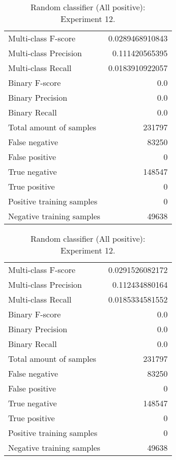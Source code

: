 \begin{table}[H]
\begin{minipage}{0.5\textwidth}
\caption{Random classifier (All positive): \\Experiment 11.}
\centering
\begin{tabular}{l r}
\toprule
Multi-class F-score & 0.0289468910843 \\
Multi-class Precision & 0.111420565395 \\
Multi-class Recall & 0.0183910922057 \\
\midrule
Binary F-score & 0.0 \\
Binary Precision & 0.0 \\
Binary Recall & 0.0 \\
\midrule
Total amount of samples & 231797 \\
False negative & 83250 \\
False positive & 0 \\
True negative & 148547 \\
True positive & 0 \\
\midrule
Positive training samples & 0 \\
Negative training samples & 49638 \\
\bottomrule
\end{tabular}
\end{minipage}
\hfillx
\begin{minipage}{0.5\textwidth}
\caption{Random classifier (All positive): \\Experiment 12.}
\centering
\begin{tabular}{l r}
\toprule
Multi-class F-score & 0.0291526082172 \\
Multi-class Precision & 0.112434880164 \\
Multi-class Recall & 0.0185334581552 \\
\midrule
Binary F-score & 0.0 \\
Binary Precision & 0.0 \\
Binary Recall & 0.0 \\
\midrule
Total amount of samples & 231797 \\
False negative & 83250 \\
False positive & 0 \\
True negative & 148547 \\
True positive & 0 \\
\midrule
Positive training samples & 0 \\
Negative training samples & 49638 \\
\bottomrule
\end{tabular}
\end{minipage}
\end{table}
